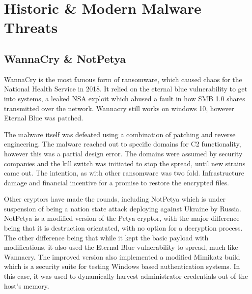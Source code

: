 
\section{Historic \& Modern Malware Threats}





\subsection{WannaCry \& NotPetya}
WannaCry is the most famous form of ransomware, which caused chaos for the National Health Service in 2018. It relied on the eternal blue vulnerability to get into systems, a leaked NSA exploit which abused a fault in how SMB 1.0 shares transmitted over the network.
Wannacry still works on windows 10, however Eternal Blue was patched. 

The malware itself was defeated using a combination of patching and reverse engineering. The malware reached out to specific domains for C2 functionality, however this was a partial design error. 
The domains were assumed by security companies and the kill switch was initiated to stop the spread, until new strains came out. The intention, as with other ransomware was two fold. Infrastructure damage and financial incentive for a promise to restore the encrypted files.

Other cryptors have made the rounds, including NotPetya which is under suspension of being a nation state attack deploying against Ukraine by Russia. \citep{notPetya} NotPetya is a modified version of the Petya cryptor, with the major difference being that it is destruction orientated, with no option for a decryption process.
The other difference being that while it kept the basic payload with modifications, it also used the Eternal Blue vulnerability to spread, much like Wannacry. The improved version also implemented a modified Mimikatz build which is a security suite for testing Windows based authentication systems. In this case,
it was used to dynamically harvest administrator credentials out of the host's memory. \citep{NotPetya02}

